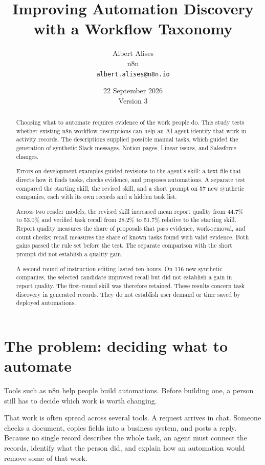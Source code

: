 \documentclass[11pt]{article}
\title{Improving Automation Discovery with a Workflow Taxonomy}
\author{Albert Alises\\n8n\\\texttt{albert.alises@n8n.io}}
\date{22 September 2026\\Version 3}
\begin{document}
\maketitle
\begin{abstract}
Choosing what to automate requires evidence of the work people do. This study tests whether existing n8n workflow descriptions can help an AI agent identify that work in activity records. The descriptions supplied possible manual tasks, which guided the generation of synthetic Slack messages, Notion pages, Linear issues, and Salesforce changes.

Errors on development examples guided revisions to the agent's skill: a text file that directs how it finds tasks, checks evidence, and proposes automations. A separate test compared the starting skill, the revised skill, and a short prompt on 57 new synthetic companies, each with its own records and a hidden task list.

Across two reader models, the revised skill increased mean report quality from 44.7\% to 53.0\% and verified task recall from 28.2\% to 51.7\% relative to the starting skill. Report quality measures the share of proposals that pass evidence, work-removal, and count checks; recall measures the share of known tasks found with valid evidence. Both gains passed the rule set before the test. The separate comparison with the short prompt did not establish a quality gain.

A second round of instruction editing lasted ten hours. On 116 new synthetic companies, the selected candidate improved recall but did not establish a gain in report quality. The first-round skill was therefore retained. These results concern task discovery in generated records. They do not establish user demand or time saved by deployed automations.

\end{abstract}

\section{The problem: deciding what to automate}
Tools such as n8n help people build automations. Before building one, a person still has to decide which work is worth changing.

That work is often spread across several tools. A request arrives in chat. Someone checks a document, copies fields into a business system, and posts a reply. Because no single record describes the whole task, an agent must connect the records, identify what the person did, and explain how an automation would remove some of that work.
\end{document}
